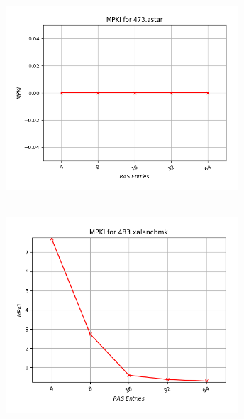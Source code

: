    \begin{minipage}{\textwidth}
      \begin{center}
         \\
         \vspace{3mm}
         \includegraphics[width=0.65\textwidth, frame]{./graphs/4-4/473-astar.png}
         \vspace{6mm}
      \end{center}
   \end{minipage}

   \begin{minipage}{\textwidth}
      \begin{center}
         \\
         \vspace{3mm}
         \includegraphics[width=0.65\textwidth, frame]{./graphs/4-4/483-xalancbmk.png}
         \vspace{6mm}
      \end{center}
   \end{minipage}


